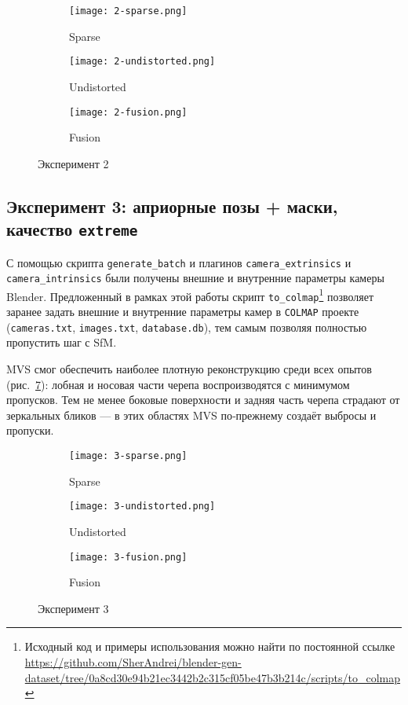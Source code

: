 \begin{figure}[h]
    \centering
    \begin{subfigure}[b]{0.3\textwidth}
        \texttt{[image: 2-sparse.png]}
        \caption{Sparse}
        \label{fig:2sparse}
    \end{subfigure}
    \hfill
    \begin{subfigure}[b]{0.3\textwidth}
        \texttt{[image: 2-undistorted.png]}
        \caption{Undistorted}
        \label{fig:2undistorted}
    \end{subfigure}
    \hfill
    \begin{subfigure}[b]{0.3\textwidth}
        \texttt{[image: 2-fusion.png]}
        \caption{Fusion}
        \label{fig:2fusion}
    \end{subfigure}
    \caption{Эксперимент 2}
    \label{fig:2exp}
\end{figure}

\subsection{Эксперимент 3: априорные позы + маски, качество \texttt{extreme}}

С помощью скрипта \texttt{generate\_batch} и плагинов
\texttt{camera\_extrinsics} и \texttt{camera\_intrinsics} были получены внешние
и внутренние параметры камеры Blender. Предложенный в рамках этой работы скрипт
\texttt{to\_colmap}\footnote{Исходный код и примеры использования можно найти по
постоянной ссылке
\url{https://github.com/SherAndrei/blender-gen-dataset/tree/0a8cd30e94b21ec3442b2c315cf05be47b3b214c/scripts/to_colmap}}
позволяет заранее задать внешние и внутренние параметры камер в \texttt{COLMAP}
проекте (\texttt{cameras.txt}, \texttt{images.txt}, \texttt{database.db}), тем
самым позволяя полностью пропустить шаг с SfM.

MVS смог обеспечить наиболее плотную реконструкцию среди всех опытов
(рис.~\ref{fig:3fusion}): лобная и носовая части черепа воспроизводятся с
минимумом пропусков. Тем не менее боковые поверхности и задняя часть черепа
страдают от зеркальных бликов — в этих областях MVS по‑прежнему создаёт выбросы
и пропуски.

\begin{figure}[h]
    \centering
    \begin{subfigure}[b]{0.3\textwidth}
        \texttt{[image: 3-sparse.png]}
        \caption{Sparse}
        \label{fig:3sparse}
    \end{subfigure}
    \hfill
    \begin{subfigure}[b]{0.3\textwidth}
        \texttt{[image: 3-undistorted.png]}
        \caption{Undistorted}
        \label{fig:3undistorted}
    \end{subfigure}
    \hfill
    \begin{subfigure}[b]{0.3\textwidth}
        \texttt{[image: 3-fusion.png]}
        \caption{Fusion}
        \label{fig:3fusion}
    \end{subfigure}
    \caption{Эксперимент 3}
    \label{fig:3exp}
\end{figure}

